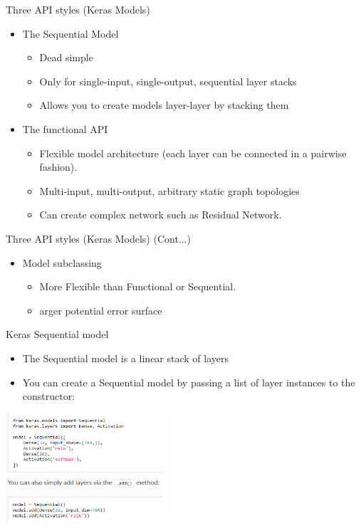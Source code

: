 \documentclass[aspectratio=169,14pt,usenames,dvipsnames]{beamer}
\begin{document}
\begin{frame}{Three API styles (Keras Models)}
\begin{itemize}
\item The Sequential Model
\begin{itemize}
\item Dead simple
\item Only for single-input, single-output, sequential layer stacks
\item Allows you to create models layer-layer by stacking them
\end{itemize}
\end{itemize}

\begin{itemize}
\item The functional API
\begin{itemize}
\item Flexible model architecture (each layer can be connected in a pairwise fashion).
\item Multi-input, multi-output, arbitrary static graph topologies
\item Can create complex network such as Residual Network.

\end{itemize}
\end{itemize}
\end{frame}


\begin{frame}{Three API styles (Keras Models) (Cont...)}
\begin{itemize}
\item Model subclassing
\begin{itemize}
\item More Flexible than Functional or Sequential.
\item arger potential error surface
\end{itemize}
\end{itemize}

\end{frame}

\begin{frame}{Keras Sequential model}
\begin{itemize}
\item The Sequential model is a linear stack of layers
\item You can create a Sequential model by passing a list of layer instances to the constructor:
\end{itemize}
\centering
\includegraphics[width=0.45\textwidth, height=0.45\textheight]{Keras_Images/Ker_1.png}
\end{frame}
\end{document}
